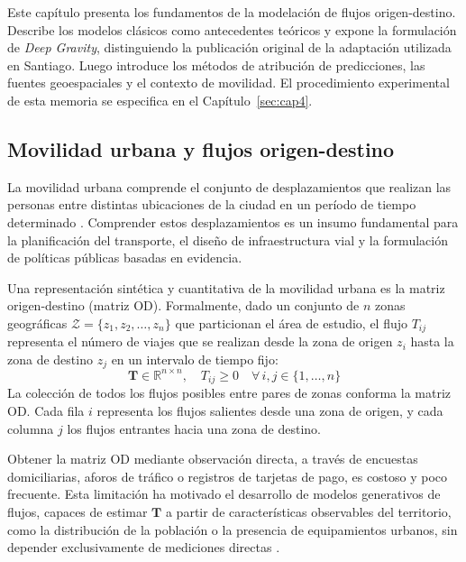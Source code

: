 
Este capítulo presenta los fundamentos de la modelación de flujos origen-destino. Describe los modelos clásicos como antecedentes teóricos y expone la formulación de \textit{Deep Gravity}, distinguiendo la publicación original de la adaptación utilizada en Santiago. Luego introduce los métodos de atribución de predicciones, las fuentes geoespaciales y el contexto de movilidad. El procedimiento experimental de esta memoria se especifica en el Capítulo~\ref{sec:cap4}.

\subsection{Movilidad urbana y flujos origen-destino}

La movilidad urbana comprende el conjunto de desplazamientos que realizan las personas entre distintas ubicaciones de la ciudad en un período de tiempo determinado \cite{liu2024interdisciplinary}. Comprender estos desplazamientos es un insumo fundamental para la planificación del transporte, el diseño de infraestructura vial y la formulación de políticas públicas basadas en evidencia.

Una representación sintética y cuantitativa de la movilidad urbana es la matriz origen-destino (matriz OD). Formalmente, dado un conjunto de $n$ zonas geográficas $\mathcal{Z} = \{z_1, z_2, \dots, z_n\}$ que particionan el área de estudio, el flujo $T_{ij}$ representa el número de viajes que se realizan desde la zona de origen $z_i$ hasta la zona de destino $z_j$ en un intervalo de tiempo fijo:
\begin{equation}
    \mathbf{T} \in \mathbb{R}^{n \times n}, \quad T_{ij} \geq 0 \quad \forall\, i, j \in \{1, \dots, n\}
    \label{eq:matriz_od}
\end{equation}
La colección de todos los flujos posibles entre pares de zonas conforma la matriz OD. Cada fila $i$ representa los flujos salientes desde una zona de origen, y cada columna $j$ los flujos entrantes hacia una zona de destino.

Obtener la matriz OD mediante observación directa, a través de encuestas domiciliarias, aforos de tráfico o registros de tarjetas de pago, es costoso y poco frecuente. Esta limitación ha motivado el desarrollo de modelos generativos de flujos, capaces de estimar $\mathbf{T}$ a partir de características observables del territorio, como la distribución de la población o la presencia de equipamientos urbanos, sin depender exclusivamente de mediciones directas \cite{simini2021deep}.

